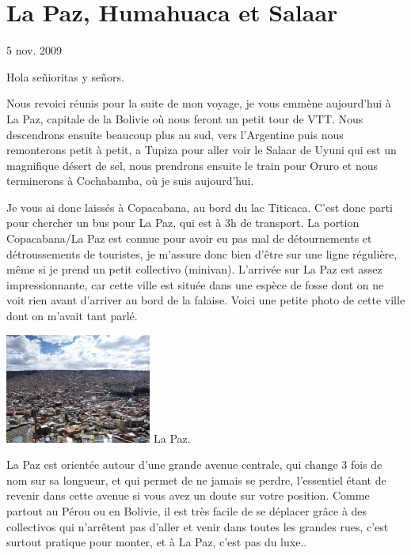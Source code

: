 \section{La Paz, Humahuaca et Salaar}

5 nov. 2009

\begin{multicols}{2}

Hola señioritas y señors.

Nous revoici réunis pour la suite de mon voyage, je vous emmène aujourd'hui à La Paz, capitale de la Bolivie où nous feront un petit tour de VTT. Nous descendrons ensuite beaucoup plus au sud, vers l'Argentine puis nous remonterons petit à petit, a Tupiza pour aller voir le Salaar de Uyuni qui est un magnifique désert de sel, nous prendrons ensuite le train pour Oruro et nous terminerons à Cochabamba, où je suis aujourd'hui.

Je vous ai donc laissés à Copacabana, au bord du lac Titicaca. C'est donc parti pour chercher un bus pour La Paz, qui est à 3h de transport. La portion Copacabana/La Paz est connue pour avoir eu pas mal de détournements et détroussements de touristes, je m'assure donc bien d'être sur une ligne régulière, même si je prend un petit collectivo (minivan). L'arrivée sur La Paz est assez impressionnante, car cette ville est située dans une espèce de fosse dont on ne voit rien avant d'arriver au bord de la falaise. Voici une petite photo de cette ville dont on m'avait tant parlé.

\hspace*{-0.65cm}
\includegraphics[width=4.8cm]{articles/La-paz-humahuaca-et-salaar/1257387232lefu.jpg}
La Paz.

La Paz est orientée autour d'une grande avenue centrale, qui change 3 fois de nom sur sa longueur, et qui permet de ne jamais se perdre, l'essentiel étant de revenir dans cette avenue si vous avez un doute sur votre position. Comme partout au Pérou ou en Bolivie, il est très facile de se déplacer grâce à des collectivos qui n'arrêtent pas d'aller et venir dans toutes les grandes rues, c'est surtout pratique pour monter, et à La Paz, c'est pas du luxe..


\end{multicols}
